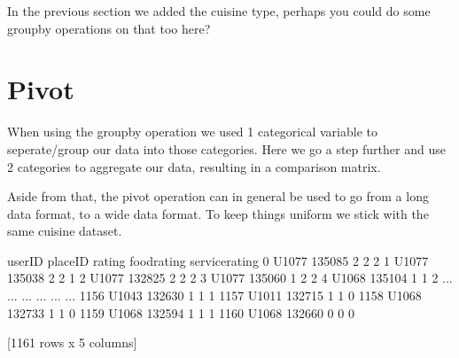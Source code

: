 \documentclass[letterpaper,10pt,english]{jupyterBook}
\begin{document}
\sphinxAtStartPar
In the previous section we added the cuisine type, perhaps you could do some groupby operations on that too here?


\chapter{Pivot}
\label{\detokenize{c3_data_preprocessing/pivot:pivot}}\label{\detokenize{c3_data_preprocessing/pivot::doc}}
\sphinxAtStartPar
When using the groupby operation we used 1 categorical variable to seperate/group our data into those categories.
Here we go a step further and use 2 categories to aggregate our data, resulting in a comparison matrix.

\sphinxAtStartPar
Aside from that, the pivot operation can in general be used to go from a long data format, to a wide data format.
To keep things uniform we stick with the same cuisine dataset.

\begin{sphinxVerbatim}[commandchars=\\\{\}]
   
\end{sphinxVerbatim}

\begin{sphinxVerbatim}[commandchars=\\\{\}]
  
\end{sphinxVerbatim}

\begin{sphinxVerbatim}[commandchars=\\\{\}]
     userID  placeID  rating  food\PYGZus{}rating  service\PYGZus{}rating
0     U1077   135085       2            2               2
1     U1077   135038       2            2               1
2     U1077   132825       2            2               2
3     U1077   135060       1            2               2
4     U1068   135104       1            1               2
...     ...      ...     ...          ...             ...
1156  U1043   132630       1            1               1
1157  U1011   132715       1            1               0
1158  U1068   132733       1            1               0
1159  U1068   132594       1            1               1
1160  U1068   132660       0            0               0

[1161 rows x 5 columns]
\end{sphinxVerbatim}
\end{document}
